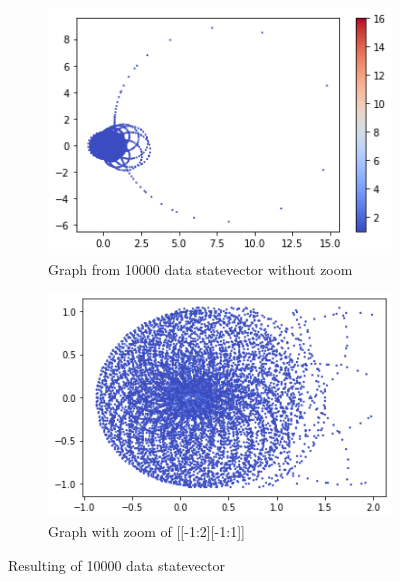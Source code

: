 \begin{figure}[ht!]
        \centering
        \begin{subfigure}[c]{0.5\textwidth}
                \includegraphics[width=\textwidth]{Chapitre1/Figures/exp1_100_nonZoom.png}
                \caption{Graph from 10000 data statevector without zoom}
        \end{subfigure}%
        \begin{subfigure}[c]{0.5\textwidth}
                \includegraphics[width=\textwidth]{Chapitre1/Figures/exp1_100_zoom.png}
                \caption{Graph with zoom of [[-1:2][-1:1]]}
        \end{subfigure}
        \caption{Resulting of 10000 data statevector}
\end{figure}





